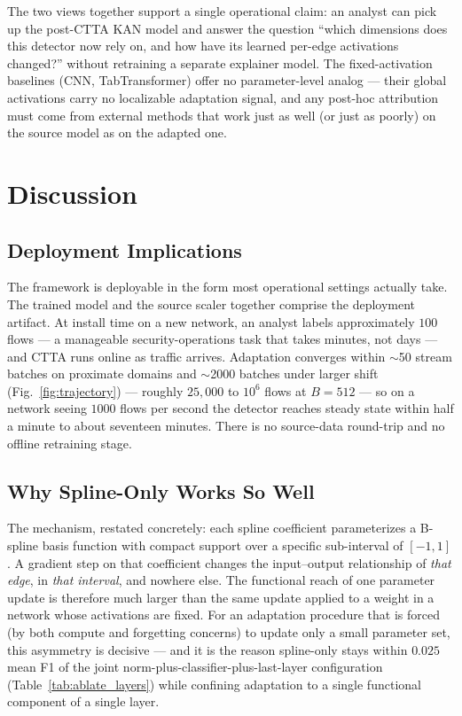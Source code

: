 \documentclass[10pt, conference, letterpaper]{IEEEtran}
\begin{document}
The two views together support a single operational claim: an analyst can pick up the post-CTTA KAN model and answer the question ``which dimensions does this detector now rely on, and how have its learned per-edge activations changed?'' without retraining a separate explainer model. The fixed-activation baselines (CNN, TabTransformer) offer no parameter-level analog --- their global activations carry no localizable adaptation signal, and any post-hoc attribution must come from external methods that work just as well (or just as poorly) on the source model as on the adapted one.


\section{Discussion}
\label{sec:discussion}

\subsection{Deployment Implications}

The framework is deployable in the form most operational settings actually take. The trained model and the source scaler together comprise the deployment artifact. At install time on a new network, an analyst labels approximately $100$ flows --- a manageable security-operations task that takes minutes, not days --- and CTTA runs online as traffic arrives. Adaptation converges within $\sim$50 stream batches on proximate domains and $\sim$2000 batches under larger shift (Fig.~\ref{fig:trajectory}) --- roughly $25{,}000$ to $10^6$ flows at $B = 512$ --- so on a network seeing $1000$ flows per second the detector reaches steady state within half a minute to about seventeen minutes. There is no source-data round-trip and no offline retraining stage.

\subsection{Why Spline-Only Works So Well}

The mechanism, restated concretely: each spline coefficient parameterizes a B-spline basis function with compact support over a specific sub-interval of $[-1, 1]$. A gradient step on that coefficient changes the input--output relationship of \emph{that edge}, in \emph{that interval}, and nowhere else. The functional reach of one parameter update is therefore much larger than the same update applied to a weight in a network whose activations are fixed. For an adaptation procedure that is forced (by both compute and forgetting concerns) to update only a small parameter set, this asymmetry is decisive --- and it is the reason spline-only stays within $0.025$ mean F1 of the joint norm-plus-classifier-plus-last-layer configuration (Table~\ref{tab:ablate_layers}) while confining adaptation to a single functional component of a single layer.
\end{document}
